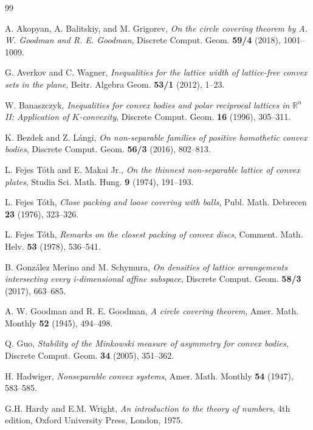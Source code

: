 \documentclass[12pt]{article}
\begin{document}
\begin{thebibliography}{99}

 A. Akopyan, A. Balitskiy, and M. Grigorev, \emph{On the circle covering theorem by A. W. Goodman and R. E. Goodman}, Discrete Comput. Geom. \textbf{59/4} (2018), 1001--1009.

G. Averkov and C. Wagner, \emph{Inequalities for the lattice width of lattice-free convex sets in the plane}, Beitr. Algebra Geom. \textbf{53/1} (2012), 1--23.



 W. Banaszczyk, \emph{Inequalities for convex bodies and polar reciprocal lattices in $\mathbb{R}^n$ II: Application of $K$-convexity}, Discrete Comput. Geom. \textbf{16} (1996), 305--311.


 K. Bezdek and Z. L\'angi, \emph{On non-separable families of positive homothetic convex bodies}, Discrete Comput. Geom. \textbf{56/3} (2016), 802--813.

L. Fejes T\'oth and E. Makai Jr., \emph{On the thinnest non-separable lattice of convex plates}, Studia Sci. Math. Hung. \textbf{9} (1974), 191--193. 

L. Fejes T\'oth, \emph{Close packing and loose covering with balls}, Publ. Math. Debrecen \textbf{23} (1976), 323--326.

L. Fejes T\'oth, \emph{Remarks on the closest packing of convex discs}, Comment. Math. Helv. \textbf{53} (1978), 536--541.

B. Gonz\'alez Merino and M. Schymura, \emph{On densities of lattice arrangements intersecting every i-dimensional affine subspace}, Discrete Comput. Geom. \textbf{58/3} (2017), 663--685.

 A. W. Goodman and R. E. Goodman, \emph{A circle covering theorem}, Amer. Math. Monthly \textbf{52} (1945), 494--498.

 Q. Guo, \emph{Stability of the Minkowski measure of asymmetry for convex bodies},  Discrete Comput. Geom. \textbf{34} (2005), 351--362.

 H. Hadwiger, \emph{Nonseparable convex systems}, Amer. Math. Monthly \textbf{54} (1947), 583--585.


 G.H. Hardy and E.M. Wright, \emph{An introduction to the theory of numbers}, 4th edition, Oxford University Press, London, 1975.



\end{thebibliography}
\end{document}
